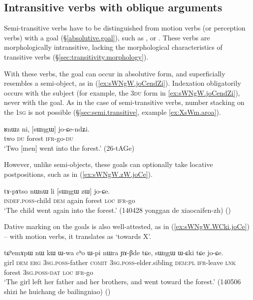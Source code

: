 \subsection{Intransitive verbs with oblique arguments} \label{sec:intr.goal}
Semi-transitive verbs have to be distinguished from motion verbs (or perception verbs) with a goal (§\ref{absolutive.goal}), such as ,  or . These verbs are morphologically intransitive, lacking the morphological characteristics of transitive verbs (§\ref{sec:transitivity.morphology}). 
 
With these verbs, the goal can occur in absolutive form, and superficially resembles a semi-object, as  in (\ref{ex:sWNgW.joCendZi}). Indexation obligatorily occurs with the subject (for example, the \textsc{3du} form in \ref{ex:sWNgW.joCendZi}), never with the goal. As in the case of semi-transitive verbs, number stacking on the \textsc{1sg}  is not possible (§\ref{sec:semi.transitive}, example \ref{ex:XsWm.aroa}).

\begin{exe}
\ex   \label{ex:sWNgW.joCendZi}
 \gll ʁnɯz ni, [sɯŋgɯ] jo-ɕe-ndʑi. \\
two \textsc{du} forest \textsc{ifr}-go-\textsc{du} \\
\glt `Two [men] went into the forest.' (26-tAGe)
\end{exe}

However, unlike semi-objects, these goals can optionally take locative postpositions, such as  in (\ref{ex:sWNgW.zW.joCe}).

\begin{exe}
\ex   \label{ex:sWNgW.zW.joCe}
 \gll tɤ-pɤtso nɯnɯ li [sɯŋgɯ zɯ] jo-ɕe. \\
 \textsc{indef}.\textsc{poss}-child \textsc{dem} again forest \textsc{loc} \textsc{ifr}-go \\
 \glt `The child went again into the forest.' (140428 yonggan de xiaocaifen-zh) ()
\end{exe}

Dative marking on the goals is also well-attested, as in (\ref{ex:sWNgW.WCki.joCe}) -- with motion verbs, it translates as `towards X'.

\begin{exe}
\ex   \label{ex:sWNgW.WCki.joCe}
 \gll tɕʰemɤpɯ nɯ kɯ ɯ-wa cʰo ɯ-pi nɯra ɲɤ-βde tɕe, sɯŋgɯ ɯ-ɕki tɕe jo-ɕe. \\
girl \textsc{dem} \textsc{erg} \textsc{3sg}.\textsc{poss}-father \textsc{comit} \textsc{3sg}.\textsc{poss}-elder.sibling \textsc{dem}:\textsc{pl} \textsc{ifr}-leave \textsc{lnk} forest \textsc{3sg}.\textsc{poss}-\textsc{dat} \textsc{loc} \textsc{ifr}-go \\
\glt `The girl left her father and her brothers, and went toward the forest.' (140506 shizi he huichang de bailingniao)
()
\end{exe}

